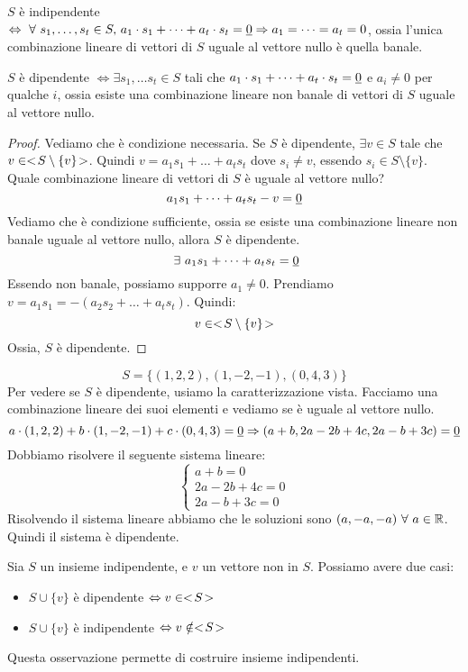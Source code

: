 $S$ \`e indipendente $\iff \forall s_1, \dots, s_t \in S , \, a_1 \cdot s_1 + \dots + a_t \cdot s_t = \nullelement \implies a_1 = \dots = a_t = 0$, ossia l'unica combinazione lineare di vettori di $S$ uguale al vettore nullo \`e quella banale.

$S$ \`e dipendente $\iff \exists s_1, \dots s_t \in S$ tali che $a_1 \cdot s_1 + \dots + a_t \cdot s_t = \underline{0}$ e $a_i \neq 0$ per qualche $i$, ossia esiste una combinazione lineare non banale di vettori di $S$ uguale al vettore nullo.

\begin{proof}
Vediamo che \`e condizione necessaria. Se $S$ \`e dipendente, $\exists v \in S$ tale che $v \in <\!{S \setminus \{v\}}\!>$. Quindi $v = a_1 s_1 + \dots + a_t s_t$ dove $s_i \neq v$, essendo $s_i \in S \setminus \{v\}$. Quale combinazione lineare di vettori di $S$ \`e uguale al vettore nullo?
\[
a_1 s_1 + \dots + a_t s_t - v = \underline{0}
\]
Vediamo che \`e condizione sufficiente, ossia se esiste una combinazione lineare non banale uguale al vettore nullo, allora $S$ \`e dipendente.
\[
\exists a_1 s_1 + \dots + a_t s_t = \nullelement
\]
Essendo non banale, possiamo supporre $a_1 \neq 0$. Prendiamo $v = a_1 s_1 = -(a_2 s_2 + \dots + a_t s_t)$. Quindi:
\[
v \in <\!{S \setminus \{v\}}\!>
\]
Ossia, $S$ \`e dipendente.
\end{proof}
\[
S = \{ (1, 2, 2) , (1, -2, -1), (0, 4, 3) \}
\]
Per vedere se $S$ \`e dipendente, usiamo la caratterizzazione vista. Facciamo una combinazione lineare dei suoi elementi e vediamo se \`e uguale al vettore nullo.
\[
a \cdot (1, 2, 2) + b \cdot (1, -2, -1) + c \cdot (0, 4, 3) = \underline{0} \Rightarrow
(a + b, 2a - 2b + 4c, 2a - b + 3c) = \underline{0}
\]
Dobbiamo risolvere il seguente sistema lineare:
\[
\begin{cases}
a + b = 0 \\
2a - 2b + 4c = 0 \\
2a - b + 3c = 0
\end{cases}
\]
Risolvendo il sistema lineare abbiamo che le soluzioni sono $(a, -a, -a) \forall a \in \reals$. Quindi il sistema \`e dipendente.

\begin{fact}
Sia $S$ un insieme indipendente, e $v$ un vettore non in $S$. Possiamo avere due casi:
\begin{itemize}
    \item $S \cup \{ v \}$ \`e dipendente $\Leftrightarrow v \in <\!{S}\!>$
    \item $S \cup \{ v \}$ \`e indipendente $\Leftrightarrow v \notin <\!{S}\!>$
\end{itemize}
Questa osservazione permette di costruire insieme indipendenti.
\end{fact}

